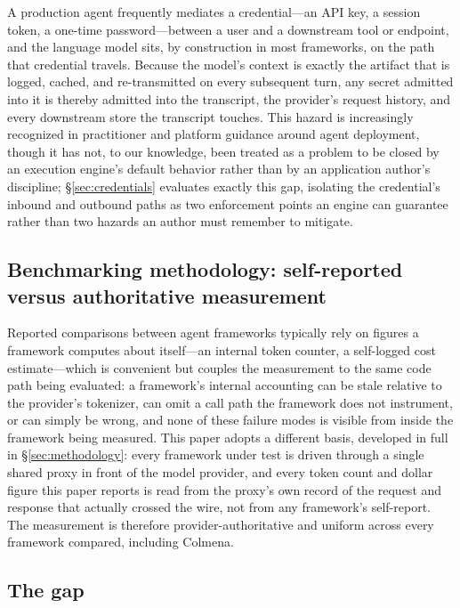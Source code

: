 A production agent frequently mediates a credential---an API key, a
session token, a one-time password---between a user and a downstream
tool or endpoint, and the language model sits, by construction in most
frameworks, on the path that credential travels. Because the model's
context is exactly the artifact that is logged, cached, and
re-transmitted on every subsequent turn, any secret admitted into it is
thereby admitted into the transcript, the provider's request history, and
every downstream store the transcript touches. This hazard is
increasingly recognized in practitioner and platform guidance around
agent deployment, though it has not, to our knowledge, been treated as a
problem to be closed by an execution engine's default behavior rather
than by an application author's discipline; \S\ref{sec:credentials}
evaluates exactly this gap, isolating the credential's inbound and
outbound paths as two enforcement points an engine can guarantee rather
than two hazards an author must remember to mitigate.

\subsection{Benchmarking methodology: self-reported versus authoritative measurement}
\label{subsec:rw-benchmarking}

Reported comparisons between agent frameworks typically rely on figures a
framework computes about itself---an internal token counter, a
self-logged cost estimate---which is convenient but couples the
measurement to the same code path being evaluated: a framework's internal
accounting can be stale relative to the provider's tokenizer, can omit a
call path the framework does not instrument, or can simply be wrong, and
none of these failure modes is visible from inside the framework being
measured. This paper adopts a different basis, developed in full in
\S\ref{sec:methodology}: every framework under test is driven through a
single shared proxy in front of the model provider, and every token count
and dollar figure this paper reports is read from the proxy's own record
of the request and response that actually crossed the wire, not from any
framework's self-report. The measurement is therefore provider-authoritative
and uniform across every framework compared, including Colmena.

\subsection{The gap}
\label{subsec:rw-gap}

